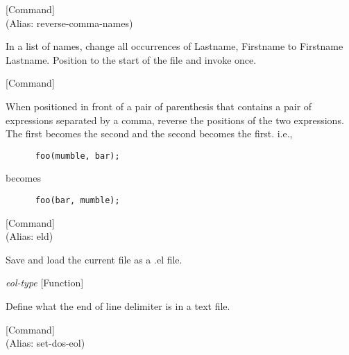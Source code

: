 \vspace{1em}
\noindent
{}
\usebox{\funcname}
 \hfill [Command]\\%
 (Alias: reverse-comma-names)

\begin{doc-string}
In a list of names, change all occurrences
of Lastname, Firstname to Firstname Lastname.
Position to the start of the file and invoke once.
\end{doc-string}

\vspace{1em}
\noindent
{}
\usebox{\funcname}
 \hfill [Command]

\begin{doc-string}
When positioned in front of a pair of parenthesis that contains a pair of
expressions separated by a comma, reverse the positions of the two expressions.
The first becomes the second and the second becomes the first.
i.e.,
\small{\begin{verbatim}
      foo(mumble, bar);
\end{verbatim}}
becomes
\small{\begin{verbatim}
      foo(bar, mumble);
\end{verbatim}}
\end{doc-string}

\vspace{1em}
\noindent
{}
\usebox{\funcname}
 \hfill [Command]\\%
 (Alias: eld)

\begin{doc-string}
Save and load the current file as a .el file.
\end{doc-string}

\vspace{1em}
\noindent
{}
\usebox{\funcname}\emph{eol-type}
 \hfill [Function]

\begin{doc-string}
Define what the end of line delimiter is in a text file.
\end{doc-string}

\vspace{1em}
\noindent
{}
\usebox{\funcname}
 \hfill [Command]\\%
 (Alias: set-dos-eol)

